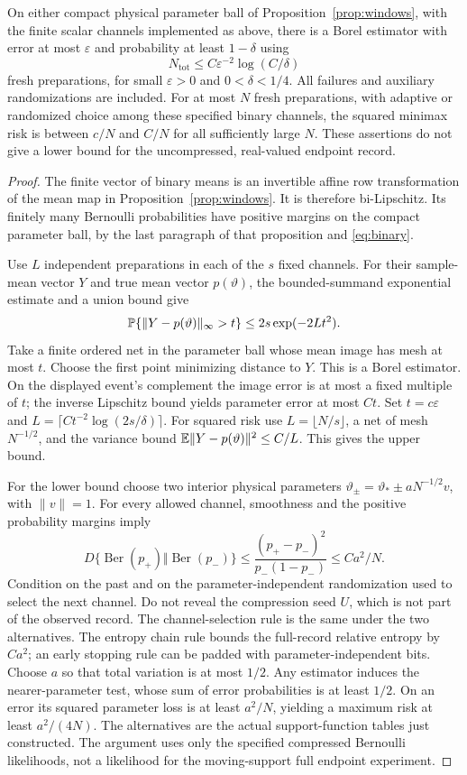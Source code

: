 \begin{theorem}\label{thm:experiment}
On either compact physical parameter ball of Proposition~\ref{prop:windows},
with the finite scalar channels implemented as above, there is a Borel
estimator with error at most $\varepsilon$ and probability at least
$1-\delta$ using
\[
 N_{\mathrm{tot}}\le C\varepsilon^{-2}\log(C/\delta)
\]
fresh preparations, for small $\varepsilon>0$ and $0<\delta<1/4$.
All failures and auxiliary randomizations are included. For at most
$N$ fresh preparations, with adaptive or randomized choice among these
specified binary channels, the squared minimax risk is between $c/N$
and $C/N$ for all sufficiently large $N$. These assertions do not give
a lower bound for the uncompressed, real-valued endpoint record.
\end{theorem}
\begin{proof}
The finite vector of binary means is an invertible affine row
transformation of the mean map in Proposition~\ref{prop:windows}.
It is therefore bi-Lipschitz. Its finitely many Bernoulli probabilities
have positive margins on the compact parameter ball, by the last
paragraph of that proposition and \eqref{eq:binary}.

Use $L$ independent preparations in each of the $s$ fixed channels.
For their sample-mean vector $Y$ and true mean vector $p(\vartheta)$,
the bounded-summand exponential estimate and a union bound give
\[
 \mathbb P\{\|Y-p(\vartheta)\|_\infty>t\}
                 \le2s\exp(-2Lt^2).
\]
Take a finite ordered net in the parameter ball whose mean image has
mesh at most $t$. Choose the first point minimizing distance to $Y$.
This is a Borel estimator. On the displayed event's complement the
image error is at most a fixed multiple of $t$; the inverse Lipschitz
bound yields parameter error at most $Ct$. Set $t=c\varepsilon$
and $L=\lceil Ct^{-2}\log(2s/\delta)\rceil$.
For squared risk use $L=\lfloor N/s\rfloor$, a net of mesh
$N^{-1/2}$, and the variance bound
$\mathbb E\|Y-p(\vartheta)\|^2\le C/L$. This gives the upper bound.

For the lower bound choose two interior physical parameters
$\vartheta_\pm=\vartheta_*\pm aN^{-1/2}v$, with $\|v\|=1$.
For every allowed channel, smoothness and the positive probability
margins imply
\[
 D\{\operatorname{Ber}(p_+)\Vert\operatorname{Ber}(p_-)\}
 \le\frac{(p_+-p_-)^2}{p_-(1-p_-)}\le Ca^2/N.
\]
Condition on the past and on the parameter-independent randomization
used to select the next channel. Do not reveal the compression seed
$U$, which is not part of the observed record.
The channel-selection rule is the same under the two alternatives.
The entropy chain rule bounds the full-record relative entropy by
$Ca^2$; an early stopping rule can be padded with parameter-independent
bits. Choose $a$ so that total variation is at most $1/2$.
Any estimator induces the nearer-parameter test, whose sum of error
probabilities is at least $1/2$. On an error its squared parameter
loss is at least $a^2/N$, yielding a maximum risk at least $a^2/(4N)$.
The alternatives are the actual support-function tables just constructed.
The argument uses only the specified compressed Bernoulli likelihoods,
not a likelihood for the moving-support full endpoint experiment.
\end{proof}
